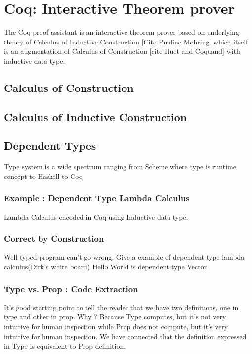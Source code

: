 \section{Coq: Interactive Theorem prover}
\label{sec:problemstatement}
The Coq proof assistant  is an interactive theorem prover based on
underlying theory of Calculus of 
Inductive Construction [Cite Pualine Mohring]  which itself is an 
augmentation of Calculus of Construction 
[cite Huet and Coquand] with inductive data-type.  
 

\subsection{Calculus of Construction}
\subsection{Calculus of Inductive Construction}
 
 

 
\subsection{Dependent Types}
    Type system is a wide spectrum ranging from Scheme where 
    type is runtime concept to Haskell to Coq 
    
    \subsubsection{Example : Dependent Type Lambda Calculus}
     Lambda Calculus encoded in Coq using Inductive data type. 
     
 \subsubsection{Correct by Construction}
  Well typed program can't go wrong. 
  Give a example of dependent type lambda calculus(Dirk's white board)
  Hello World is dependent type Vector 
 \subsubsection{Type vs. Prop : Code Extraction}
  It's good starting point to tell the reader that we have two definitions, 
  one in type and other in prop. Why ? Because Type computes, but it's
  not very intuitive for human inspection while Prop does not compute, 
  but it's very intuitive for human inspection. We have connected that 
  the definition expressed in Type is equivalent to Prop definition. 
 
